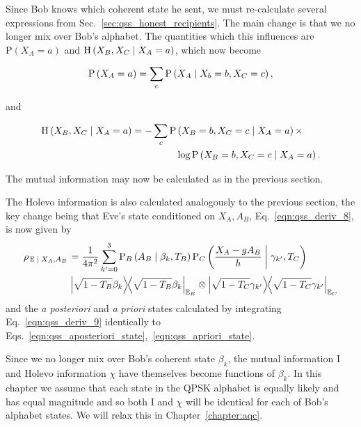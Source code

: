 Since Bob knows which coherent state he sent, we must re-calculate several expressions from Sec.~\ref{sec:qss_honest_recipients}. The main change is that we no longer mix over Bob's alphabet. The quantities which this influences are $\text{P}\left(X_A=a\right)$ and $\text{H}\left(X_B, X_C \; \middle| \; X_A=a\right)$, which now become

\begin{equation}
\text{P}\left(X_A=a\right) = \sum_{c} \text{P}\left(X_A \; \middle| \; X_b=b, X_C=c\right),
\end{equation}

\noindent and

\begin{align}
\text{H}\left(X_B, X_C \; \middle| \; X_A=a\right) = - \sum_{c} \text{P}&\left(X_B=b, X_C=c \; \middle| \; X_A=a\right) \times \notag \\
&\log \text{P}\left(X_B=b, X_C=c \; \middle| \; X_A=a\right).
\end{align}

\noindent The mutual information may now be calculated as in the previous section. 

The Holevo information is also calculated analogously to the previous section, the key change being that Eve's state conditioned on $X_A, A_B$, Eq.~\ref{eqn:qss_deriv_8}, is now given by
\begin{align}\label{eqn:qss_deriv_9}
\rho_{\left.\mathbb{E} \given X_A, A_B\right.} &= \frac{1}{4 \pi^2} \sum_{k^\prime=0}^3 \text{P}_B\left(A_B \given \beta_k, T_B\right) \text{P}_C\left(\frac{X_A - g A_B}{h} \given \gamma_{k^\prime}, T_C\right) \notag \\
%
&\dyad{\sqrt{1-T_B} \beta_k}_{\mathbb{E}_B} \otimes \dyad{\sqrt{1-T_C}\gamma_{k^\prime}}_{\mathbb{E}_C}
\end{align}
and the \emph{a posteriori} and \emph{a priori} states calculated by integrating Eq.~\ref{eqn:qss_deriv_9} identically to Eqs.~\ref{eqn:qss_aposteriori_state},~\ref{eqn:qss_apriori_state}.

Since we no longer mix over Bob's coherent state $\beta_k$, the mutual information $\text{I}$ and Holevo information $\chi$ have themselves become functions of $\beta_k$. In this chapter we assume that each state in the QPSK alphabet is equally likely and has equal magnitude and so both $\text{I}$ and $\chi$ will be identical for each of Bob's alphabet states. We will relax this in Chapter~\ref{chapter:aqc}.


